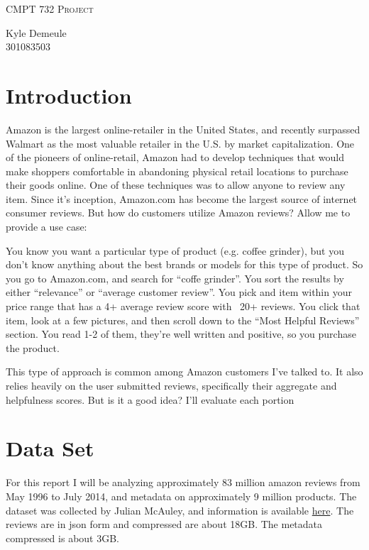 \documentclass[a4paper,11pt]{article}
\begin{document}
\begin{titlepage}
    \centering
    {\scshape\LARGE CMPT 732 Project\par}
    \vspace{1cm}
    {\Large Kyle Demeule \\ 301083503\par}
\end{titlepage}

\section*{Introduction}
Amazon is the largest online-retailer in the United States, and recently surpassed Walmart as the most valuable retailer in the U.S. by market capitalization. One of the pioneers of online-retail, Amazon had to develop techniques that would make shoppers comfortable in abandoning physical retail locations to purchase their goods online. One of these techniques was to allow anyone to review any item. Since it's inception, Amazon.com has become the largest source of internet consumer reviews. But how do customers utilize Amazon reviews? Allow me to provide a use case:

You know you want a particular type of product (e.g. coffee grinder), but you don't know anything about the best brands or models for this type of product. So you go to Amazon.com, and search for \enquote{coffe grinder}. You sort the results by either \enquote{relevance} or \enquote{average customer review}. You pick and item within your price range that has a 4+ average review score with ~20+ reviews. You click that item, look at a few pictures, and then scroll down to the \enquote{Most Helpful Reviews} section. You read 1-2 of them, they're well written and positive, so you purchase the product.

This type of approach is common among Amazon customers I've talked to. It also relies heavily on the user submitted reviews, specifically their aggregate and helpfulness scores. But is it a good idea? I'll evaluate each portion 

\section*{Data Set}
For this report I will be analyzing approximately 83 million amazon reviews from May 1996 to July 2014, and metadata on approximately 9 million products. The dataset was collected by Julian McAuley, and information is available \href{http://jmcauley.ucsd.edu/data/amazon/}{here}. The reviews are in json form and compressed are about 18GB. The metadata compressed is about 3GB.
\end{document}

